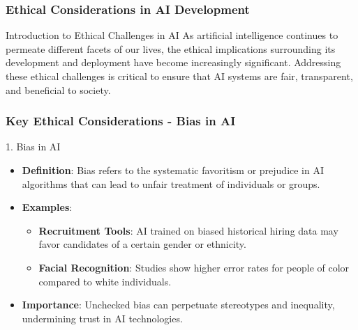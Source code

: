 \documentclass{beamer}
\begin{document}
\begin{frame}[fragile]
    \frametitle{Ethical Considerations in AI Development}
    \begin{block}{Introduction to Ethical Challenges in AI}
        As artificial intelligence continues to permeate different facets of our lives, the ethical implications surrounding its development and deployment have become increasingly significant. Addressing these ethical challenges is critical to ensure that AI systems are fair, transparent, and beneficial to society.
    \end{block}
\end{frame}

\begin{frame}[fragile]
    \frametitle{Key Ethical Considerations - Bias in AI}
    \begin{block}{1. Bias in AI}
        \begin{itemize}
            \item \textbf{Definition}: Bias refers to the systematic favoritism or prejudice in AI algorithms that can lead to unfair treatment of individuals or groups.
            \item \textbf{Examples}:
            \begin{itemize}
                \item \textbf{Recruitment Tools}: AI trained on biased historical hiring data may favor candidates of a certain gender or ethnicity.
                \item \textbf{Facial Recognition}: Studies show higher error rates for people of color compared to white individuals.
            \end{itemize}
            \item \textbf{Importance}: Unchecked bias can perpetuate stereotypes and inequality, undermining trust in AI technologies.
        \end{itemize}
    \end{block}
\end{frame}
\end{document}
